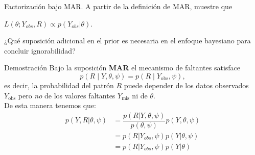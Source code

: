 \documentclass[a4paper,11pt]{article}
\begin{document}
\newpage
\begin{ejercicio}{6}
    Factorización bajo MAR.
    A partir de la definición de MAR, muestre que

    $L(\theta; Y_{obs}, R) \propto p(Y_{obs} | \theta)$.

    ¿Qué suposición adicional en el prior es necesaria en el enfoque bayesiano para concluir
    ignorabilidad?
\end{ejercicio}
\begin{demostracion}{Demostración}
    Bajo la suposición \textbf{MAR } el mecanismo de faltantes satisface
    \[
        p(R\mid Y,\theta,\psi)=p(R\mid Y_{\text{obs}},\psi),
    \]
    es decir, la probabilidad del patrón \(R\) puede depender de los datos observados \(Y_{\text{obs}}\) pero \emph{no} de los valores faltantes \(Y_{\text{mis}}\) ni de \(\theta\).\\
    De esta manera tenemos que:
    \begin{align*}
        p(Y,R| \theta,\psi) & =\dfrac{p(R|Y,\theta,\psi)}{p(\theta,\psi)}p(Y,\theta,\psi) \\
                            & =p(R|Y_{obs},\psi )p(Y|\theta,\psi)                         \\
                            & =p(R|Y_{obs},\psi )p(Y|\theta)
    \end{align*}


\end{demostracion}
\end{document}
